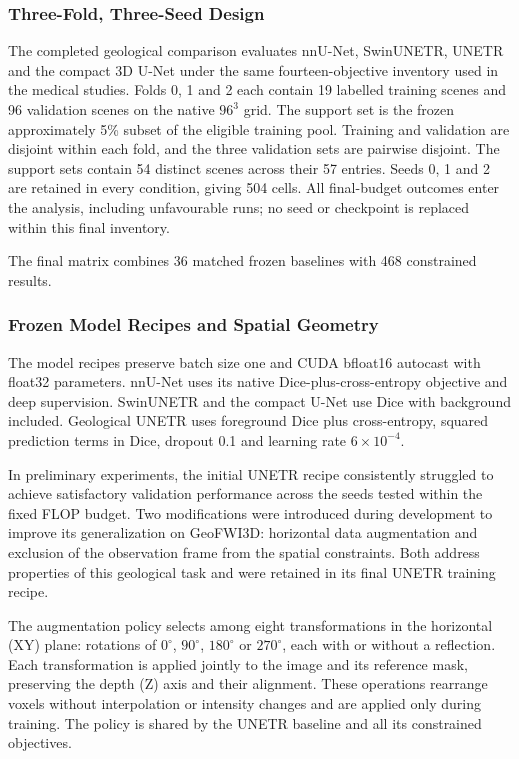 \documentclass[12pt,a4paper]{article}
\begin{document}
\subsubsection{Three-Fold, Three-Seed Design}

The completed geological comparison evaluates nnU-Net, SwinUNETR,
UNETR and the compact 3D U-Net under the same fourteen-objective
inventory used in the medical studies. Folds 0, 1 and 2 each contain
19 labelled training scenes and 96 validation scenes on the native
$96^3$ grid. The support set is the frozen approximately 5\% subset
of the eligible training pool. Training and validation are disjoint
within each fold, and the three validation sets are pairwise disjoint.
The support sets contain 54 distinct scenes across their 57 entries.
Seeds 0, 1 and 2 are retained in every condition, giving 504 cells.
All final-budget outcomes enter the analysis, including unfavourable
runs; no seed or checkpoint is replaced within this final inventory.

The final matrix combines 36 matched frozen baselines with 468
constrained results. 

\subsubsection{Frozen Model Recipes and Spatial Geometry}

The model recipes preserve batch size one and CUDA bfloat16 autocast
with float32 parameters. nnU-Net uses its native Dice-plus-cross-entropy
objective and deep supervision. SwinUNETR and the compact U-Net use
Dice with background included. Geological UNETR uses foreground
Dice plus cross-entropy, squared prediction terms in Dice, dropout
0.1 and learning rate $6\times10^{-4}$.

In preliminary experiments, the initial UNETR recipe consistently struggled
to achieve satisfactory validation performance across the seeds tested
within the fixed FLOP budget. Two modifications were introduced during
development to improve its generalization on GeoFWI3D: horizontal data
augmentation and exclusion of the observation frame from the spatial
constraints. Both address properties of this geological task and were
retained in its final UNETR training recipe.

The augmentation policy selects among eight transformations in the
horizontal (XY) plane: rotations of $0^\circ$, $90^\circ$, $180^\circ$
or $270^\circ$, each with or without a reflection. Each transformation
is applied jointly to the image and its reference mask, preserving the
depth (Z) axis and their alignment. These operations rearrange voxels
without interpolation or intensity changes and are applied only during
training. The policy is shared by the UNETR baseline and all its
constrained objectives.
\end{document}
